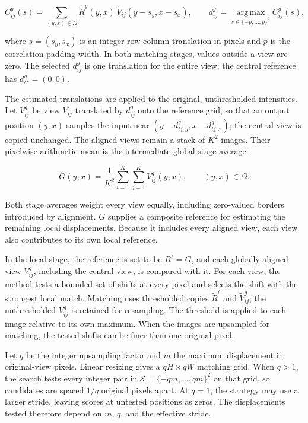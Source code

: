\begin{equation}
    C^g_{ij}(s)=\sum_{(y,x)\in\Omega}\widetilde R^g(y,x)\,\widetilde V_{ij}(y-s_y,x-s_x),
    \qquad d^g_{ij}=\operatorname*{arg\,max}_{s\in\{-p,\ldots,p\}^2} C^g_{ij}(s),
\end{equation}

where $s=(s_y,s_x)$ is an integer row-column translation in pixels and $p$ is the correlation-padding width. In both matching stages, values outside a view are zero. The selected $d^g_{ij}$ is one translation for the entire view; the central reference has $d^g_{cc}=(0,0)$.

The estimated translations are applied to the original, unthresholded intensities. Let $V^g_{ij}$ be view $V_{ij}$ translated by $d^g_{ij}$ onto the reference grid, so that an output position $(y,x)$ samples the input near $(y-d^g_{ij,y},x-d^g_{ij,x})$; the central view is copied unchanged. The aligned views remain a stack of $K^2$ images. Their pixelwise arithmetic mean is the intermediate global-stage average:

\begin{equation}
    G(y,x)=\frac{1}{K^2}\sum_{i=1}^{K}\sum_{j=1}^{K}V^g_{ij}(y,x),\qquad (y,x)\in\Omega.
\end{equation}

Both stage averages weight every view equally, including zero-valued borders introduced by alignment. $G$ supplies a composite reference for estimating the remaining local displacements. Because it includes every aligned view, each view also contributes to its own local reference.

In the local stage, the reference is set to be $R^\ell=G$, and each globally aligned view $V^g_{ij}$, including the central view, is compared with it. For each view, the method tests a bounded set of shifts at every pixel and selects the shift with the strongest local match. Matching uses thresholded copies $\widetilde R^\ell$ and $\widetilde V^g_{ij}$; the unthresholded $V^g_{ij}$ is retained for resampling. The threshold is applied to each image relative to its own maximum. When the images are upsampled for matching, the tested shifts can be finer than one original pixel.

Let $q$ be the integer upsampling factor and $m$ the maximum displacement in original-view pixels. Linear resizing gives a $qH\times qW$ matching grid. When $q>1$, the search tests every integer pair in $\mathcal S=\{-qm,\ldots,qm\}^{2}$ on that grid, so candidates are spaced $1/q$ original pixels apart. At $q=1$, the strategy may use a larger stride, leaving scores at untested positions as zeros. The displacements tested therefore depend on $m$, $q$, and the effective stride.

